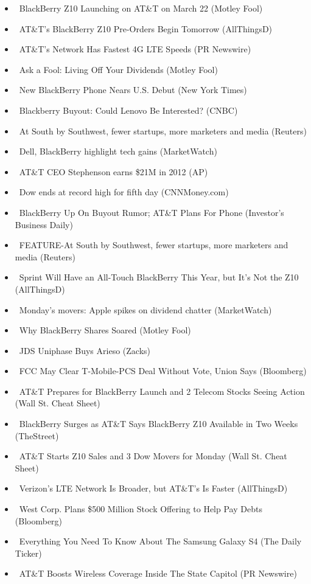 \documentclass[11pt,asymmetric]{article}
\begin{document}
\begin{itemize}
\item\ BlackBerry Z10 Launching on AT\&T on March 22 (Motley Fool)
\item\ AT\&T's BlackBerry Z10 Pre-Orders Begin Tomorrow (AllThingsD)
\item\ AT\&T's Network Has Fastest 4G LTE Speeds (PR Newswire)
\item\ Ask a Fool: Living Off Your Dividends (Motley Fool)
\item\ New BlackBerry Phone Nears U.S. Debut (New York Times)
\item\ Blackberry Buyout: Could Lenovo Be Interested? (CNBC)
\item\ At South by Southwest, fewer startups, more marketers and media (Reuters)
\item\ Dell, BlackBerry highlight tech gains (MarketWatch)
\item\ AT\&T CEO Stephenson earns \$21M in 2012 (AP)
\item\ Dow ends at record high for fifth day (CNNMoney.com)
\item\ BlackBerry Up On Buyout Rumor; AT\&T Plans For Phone (Investor's Business Daily)
\item\ FEATURE-At South by Southwest, fewer startups, more marketers and media (Reuters)
\item\ Sprint Will Have an All-Touch BlackBerry This Year, but It's Not the Z10 (AllThingsD)
\item\ Monday’s movers: Apple spikes on dividend chatter (MarketWatch)
\item\ Why BlackBerry Shares Soared (Motley Fool)
\item\ JDS Uniphase Buys Arieso (Zacks)
\item\ FCC May Clear T-Mobile-PCS Deal Without Vote, Union Says (Bloomberg)
\item\ AT\&T Prepares for BlackBerry Launch and 2 Telecom Stocks Seeing Action (Wall St. Cheat Sheet)
\item\ BlackBerry Surges as AT\&T Says BlackBerry Z10 Available in Two Weeks (TheStreet)
\item\ AT\&T Starts Z10 Sales and 3 Dow Movers for Monday (Wall St. Cheat Sheet)
\item\ Verizon's LTE Network Is Broader, but AT\&T's Is Faster (AllThingsD)
\item\ West Corp. Plans \$500 Million Stock Offering to Help Pay Debts (Bloomberg)
\item\ Everything You Need To Know About The Samsung Galaxy S4 (The Daily Ticker)
\item\ AT\&T Boosts Wireless Coverage Inside The State Capitol (PR Newswire)

\end{itemize}
\end{document}
